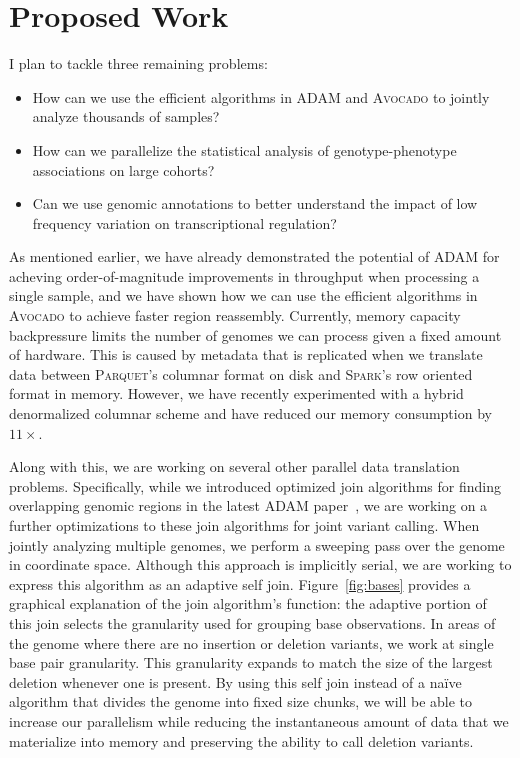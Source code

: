 \documentclass[11pt]{article} %
\begin{document}
\section{Proposed Work}

I plan to tackle three remaining problems:

\begin{itemize}
\item How can we use the efficient algorithms in \textsc{ADAM} and \textsc{Avocado} to jointly
analyze thousands of samples?
\item How can we parallelize the statistical analysis of genotype-phenotype associations on
large cohorts?
\item Can we use genomic annotations to better understand the impact of low frequency variation
on transcriptional regulation?
\end{itemize}

As mentioned earlier, we have already demonstrated the potential of \textsc{ADAM} for acheving
order-of-magnitude improvements in throughput when processing a single sample, and we have
shown how we can use the efficient algorithms in \textsc{Avocado} to achieve faster region
reassembly. Currently, memory capacity backpressure limits the number of genomes we can process
given a fixed amount of hardware. This is caused by metadata that is replicated when we translate
data between \textsc{Parquet}'s columnar format on disk and \textsc{Spark}'s row oriented format
in memory. However, we have recently experimented with a hybrid denormalized columnar scheme and
have reduced our memory consumption by $11\times$.

Along with this, we are working on several other parallel data translation problems. Specifically,
while we introduced optimized join algorithms for finding overlapping genomic regions in the
latest \textsc{ADAM} paper~\cite{nothaft15}, we are working on a further optimizations to these
join algorithms for joint variant calling. When jointly analyzing multiple genomes, we perform a
sweeping pass over the genome in coordinate space. Although this approach is implicitly serial,
we are working to express this algorithm as an adaptive self join. Figure~\ref{fig:bases} provides
a graphical explanation of the join algorithm's function: the adaptive portion of this
join selects the granularity used for grouping base observations. In areas of the genome where there
are no insertion or deletion variants, we work at single base pair granularity. This granularity
expands to match the size of the largest deletion whenever one is present. By using this self join
instead of a na\"{i}ve algorithm that divides the genome into fixed size chunks, we will be able
to increase our parallelism while reducing the instantaneous amount of data that we materialize
into memory and preserving the ability to call deletion variants.
\end{document}
